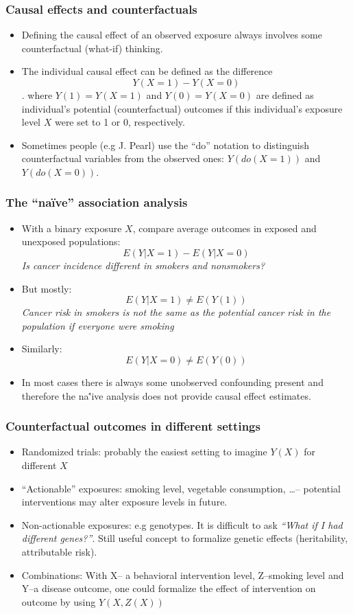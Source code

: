 \documentclass[xcolor=svgnames,handout]{beamer}
\begin{document}
\begin{frame}
\frametitle{Causal effects and counterfactuals}
\begin{itemize}
\item Defining the causal effect of an observed exposure always involves some \alert<1>{counterfactual} (what-if) thinking.
\item The individual causal effect can be defined as the difference 
 \[Y(X=1) - Y(X=0)\].
where $Y(1)=Y(X=1)$ and $Y(0)=Y(X=0)$ are defined as individual's \alert<2>{potential (counterfactual)} outcomes if this individual's exposure level $X$ were \alert<2>{set} to 1 or 0, respectively. 
\item Sometimes people (e.g J. Pearl) use the \alert<3>{``do''} notation to distinguish counterfactual variables from the observed ones: $Y(do(X=1))$ and $Y(do(X=0))$.     
\end{itemize}
\end{frame}

\begin{frame}
  \frametitle{The ``na\"ive'' association analysis}
  {\small  \begin{itemize}
  \item With a binary exposure $X$, compare average outcomes in exposed and unexposed populations:
  \[E(Y|X=1) - E(Y|X=0)\]
  \textit{Is cancer incidence different in smokers and nonsmokers?}
  \item But mostly:
  \[E(Y|X=1) \ne E(Y(1))\]
  \textit{Cancer risk in smokers is not the same as the potential cancer risk in the population if everyone were smoking}
  \item Similarly:
  \[E(Y|X=0) \ne E(Y(0))\]
  \item In most cases there is always some \alert{unobserved confounding} present and therefore the
   na\''ive analysis does not provide causal effect estimates.  
  \end{itemize}}
\end{frame}

\begin{frame}
\frametitle{Counterfactual outcomes in different settings}
\begin{itemize}
\item \alert<1>{Randomized trials}: probably the easiest setting to imagine $Y(X)$ for different $X$
\item \alert<2>{``Actionable'' exposures}: smoking level, vegetable consumption, \ldots -- potential interventions may alter exposure levels in future.
\item \alert<3>{Non-actionable exposures}: e.g genotypes. It is difficult to ask \emph{``What if I had different genes?''}. Still useful concept to formalize genetic effects (heritability, attributable risk).
\item \alert<4>{Combinations}: With X-- a behavioral intervention level, Z--smoking level and Y--a disease outcome, one could formalize the effect of intervention on outcome by using $Y(X, Z(X))$
\end{itemize}
\end{frame}
\end{document}
